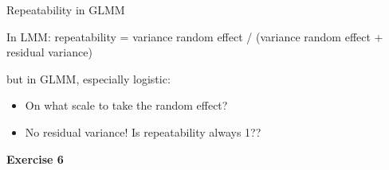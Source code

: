 \documentclass{beamer}\usepackage[]{graphicx}\usepackage[]{color}
\begin{document}
\begin{frame}{Repeatability in GLMM}

In LMM: repeatability = variance random effect / (variance random effect + residual variance)\\

\pause

\begin{alertblock}{but in GLMM, especially logistic:}
\begin{itemize}
  \item On what scale to take the random effect?
  \item No residual variance! Is repeatability always 1??
\end{itemize}
\end{alertblock}

\vfill

\textbf{Exercise 6}

\end{frame}
\end{document}
